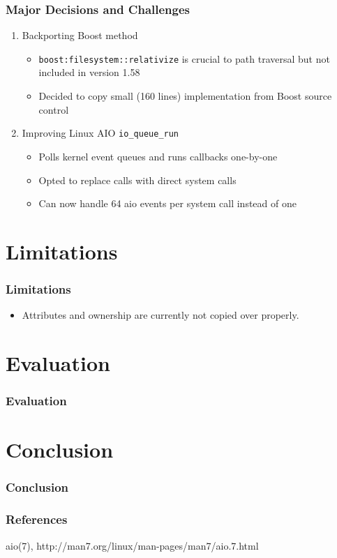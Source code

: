 \documentclass{beamer}
\begin{document}
\begin{frame}
    \frametitle{Major Decisions and Challenges}
    \begin{enumerate}[1.]
        \item{Backporting Boost method }
            \begin{itemize}
                \item{\texttt{boost:filesystem::relativize} is crucial to path
                        traversal but not included in version 1.58 }
                \item{Decided to copy small (160 lines) implementation from
                        Boost source control }
            \end{itemize}
        \item{Improving Linux AIO \texttt{io\_queue\_run} }
            \begin{itemize}
                \item{Polls kernel event queues and runs callbacks one-by-one }
                \item{Opted to replace calls with direct system calls }
                \item{Can now handle 64 aio events per system call instead of one }
            \end{itemize}
    \end{enumerate}
\end{frame}

\section{Limitations}
\begin{frame}
    \frametitle{Limitations}
    \begin{itemize}
        \item{Attributes and ownership are currently not copied over properly. }
    \end{itemize}
\end{frame}

\section{Evaluation}
\begin{frame}
    \frametitle{Evaluation}
\end{frame}

\section{Conclusion}
\begin{frame}
    \frametitle{Conclusion}
\end{frame}

\begin{frame}
    \frametitle{References}
    \footnotesize{
        \begin{thebibliography}{99}
                aio(7), http://man7.org/linux/man-pages/man7/aio.7.html
        \end{thebibliography}
        }
\end{frame}
\end{document}
